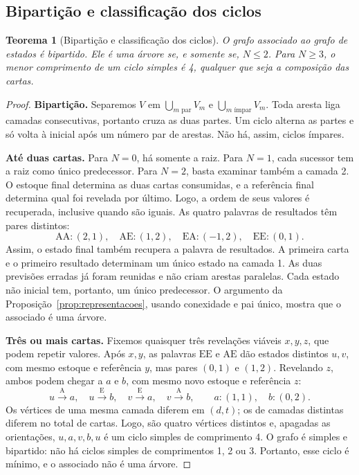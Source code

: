 \documentclass[11pt,a4paper]{article}
\newtheorem{teorema}[proposicao]{Teorema}
\theoremstyle{definition}
\newcommand{\A}{\mathrm{A}}
\newcommand{\Er}{\mathrm{E}}
\newcommand{\proxpagina}{\newpage}
\begin{document}
\proxpagina
\subsection{Bipartição e classificação dos ciclos}
\begin{teorema}[Bipartição e classificação dos ciclos]\label{teo:ciclos}
O grafo associado ao grafo de estados é bipartido. Ele é uma árvore se, e somente se, $N\le2$. Para $N\ge3$, o menor comprimento de um ciclo simples é 4, qualquer que seja a composição das cartas.
\end{teorema}

\begin{proof}
\textbf{Bipartição.} Separemos $V$ em $\bigcup_{m\text{ par}}V_m$ e $\bigcup_{m\text{ ímpar}}V_m$. Toda aresta liga camadas consecutivas, portanto cruza as duas partes. Um ciclo alterna as partes e só volta à inicial após um número par de arestas. Não há, assim, ciclos ímpares.

\textbf{Até duas cartas.} Para $N=0$, há somente a raiz. Para $N=1$, cada sucessor tem a raiz como único predecessor. Para $N=2$, basta examinar também a camada 2. O estoque final determina as duas cartas consumidas, e a referência final determina qual foi revelada por último. Logo, a ordem de seus valores é recuperada, inclusive quando são iguais. As quatro palavras de resultados têm pares distintos:
\[
\A\A:(2,1),\quad \A\Er:(1,2),\quad
\Er\A:(-1,2),\quad \Er\Er:(0,1).
\]
Assim, o estado final também recupera a palavra de resultados. A primeira carta e o primeiro resultado determinam um único estado na camada 1. As duas previsões erradas já foram reunidas e não criam arestas paralelas. Cada estado não inicial tem, portanto, um único predecessor. O argumento da Proposição~\ref{prop:representacoes}, usando conexidade e pai único, mostra que o associado é uma árvore.

\textbf{Três ou mais cartas.} Fixemos quaisquer três revelações viáveis $x,y,z$, que podem repetir valores. Após $x,y$, as palavras $\Er\Er$ e $\A\Er$ dão estados distintos $u,v$, com mesmo estoque e referência $y$, mas pares $(0,1)$ e $(1,2)$. Revelando $z$, ambos podem chegar a $a$ e $b$, com mesmo novo estoque e referência $z$:
\[
u\xrightarrow{\A}a,\quad u\xrightarrow{\Er}b,\quad
v\xrightarrow{\Er}a,\quad v\xrightarrow{\A}b,
\qquad a:(1,1),\quad b:(0,2).
\]
Os vértices de uma mesma camada diferem em $(d,t)$; os de camadas distintas diferem no total de cartas. Logo, são quatro vértices distintos e, apagadas as orientações, $u,a,v,b,u$ é um ciclo simples de comprimento 4. O grafo é simples e bipartido: não há ciclos simples de comprimentos 1, 2 ou 3. Portanto, esse ciclo é mínimo, e o associado não é uma árvore.
\end{proof}
\end{document}
